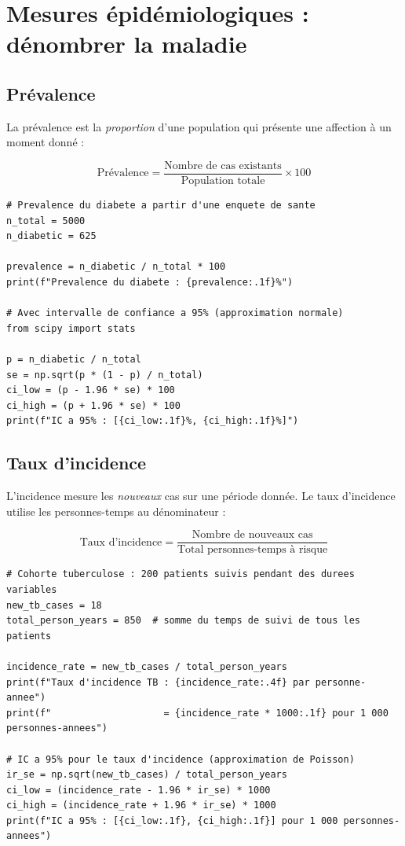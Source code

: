 \section{Mesures \'epid\'emiologiques : d\'enombrer la maladie}

\subsection{Pr\'evalence}

La pr\'evalence est la \emph{proportion} d'une population qui pr\'esente une affection \`a un moment donn\'e :

\[
\text{Pr\'evalence} = \frac{\text{Nombre de cas existants}}{\text{Population totale}} \times 100
\]

\begin{verbatim}
# Prevalence du diabete a partir d'une enquete de sante
n_total = 5000
n_diabetic = 625

prevalence = n_diabetic / n_total * 100
print(f"Prevalence du diabete : {prevalence:.1f}%")

# Avec intervalle de confiance a 95% (approximation normale)
from scipy import stats

p = n_diabetic / n_total
se = np.sqrt(p * (1 - p) / n_total)
ci_low = (p - 1.96 * se) * 100
ci_high = (p + 1.96 * se) * 100
print(f"IC a 95% : [{ci_low:.1f}%, {ci_high:.1f}%]")
\end{verbatim}

\subsection{Taux d'incidence}

L'incidence mesure les \emph{nouveaux} cas sur une p\'eriode donn\'ee. Le taux d'incidence utilise les personnes-temps au d\'enominateur :

\[
\text{Taux d'incidence} = \frac{\text{Nombre de nouveaux cas}}{\text{Total personnes-temps \`a risque}}
\]

\begin{verbatim}
# Cohorte tuberculose : 200 patients suivis pendant des durees variables
new_tb_cases = 18
total_person_years = 850  # somme du temps de suivi de tous les patients

incidence_rate = new_tb_cases / total_person_years
print(f"Taux d'incidence TB : {incidence_rate:.4f} par personne-annee")
print(f"                    = {incidence_rate * 1000:.1f} pour 1 000 personnes-annees")

# IC a 95% pour le taux d'incidence (approximation de Poisson)
ir_se = np.sqrt(new_tb_cases) / total_person_years
ci_low = (incidence_rate - 1.96 * ir_se) * 1000
ci_high = (incidence_rate + 1.96 * ir_se) * 1000
print(f"IC a 95% : [{ci_low:.1f}, {ci_high:.1f}] pour 1 000 personnes-annees")
\end{verbatim}

